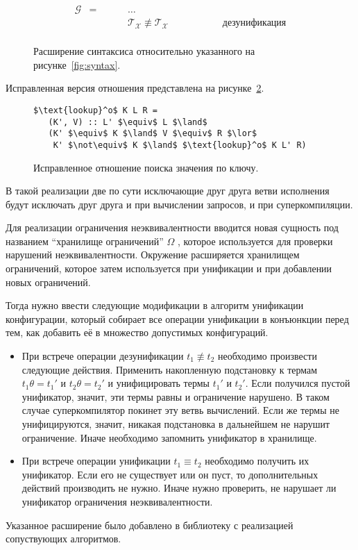 \begin{figure}[h!]
\centering
\[\begin{array}{ccll}
\mathcal{G}   & = & \hspace{1cm} \dots & \\
              &   & \hspace{1cm} \mathcal{T_X}\not\equiv\mathcal{T_X} \hspace{2cm} &\mbox{дезунификация} \\
\end{array}\]
\caption{Расширение синтаксиса \ukanren относительно указанного на рисунке~\ref{fig:syntax}.}
\label{fig:syntaxExt}
\end{figure}

Исправленная версия отношения  представлена на рисунке~\ref{fig:lookupExt}.

\begin{figure}[h!]
\begin{lstlisting}
$\text{lookup}^o$ K L R =
   (K', V) :: L' $\equiv$ L $\land$
   (K' $\equiv$ K $\land$ V $\equiv$ R $\lor$
    K' $\not\equiv$ K $\land$ $\text{lookup}^o$ K L' R)
\end{lstlisting}
\caption{Исправленное отношение поиска значения по ключу.}
\label{fig:lookupExt}
\end{figure}

В такой реализации две по сути исключающие друг друга ветви исполнения будут исключать друг друга
и при вычислении запросов, и при суперкомпиляции.

Для реализации ограничения неэквивалентности вводится новая сущность под названием
``хранилище ограничений'' $\Omega$ , которое используется для проверки
нарушений неэквивалентности. Окружение расширяется хранилищем ограничений, которое затем используется
при унификации и при добавлении новых ограничений.

Тогда нужно ввести следующие модификации в алгоритм унификации конфигурации, который собирает все
операции унификации в конъюнкции перед тем, как добавить её в множество допустимых конфигураций.
\begin{itemize}
\item При встрече операции дезунификации $t_1 \not\equiv t_2$ необходимо произвести следующие действия.
      Применить накопленную подстановку к термам $t_1 \theta = t_1'$ и $t_2 \theta = t_2'$ и 
      унифицировать термы $t_1'$ и $t_2'$. Если получился пустой унификатор, значит, эти термы
      равны и ограничение нарушено. В таком случае суперкомпилятор покинет эту
      ветвь вычислений. Если же термы не унифицируются, значит, никакая подстановка
      в дальнейшем не нарушит ограничение. Иначе необходимо запомнить унификатор в хранилище.
\item При встрече операции унификации $t_1 \equiv t_2$ необходимо получить их унификатор.
      Если его не существует или он пуст, то дополнительных действий производить не нужно.
	  Иначе нужно проверить, не нарушает ли унификатор ограничения неэквивалентности.
\end{itemize}

Указанное расширение было добавлено в библиотеку с реализацией сопуствующих алгоритмов.
